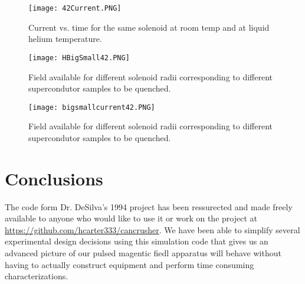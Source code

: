 \documentclass[prb,preprint]{revtex4-1}
\begin{document}
\begin{figure}[h!]
\centering
\texttt{[image: 42Current.PNG]}
\caption{Current vs. time for the same solenoid at room temp and at liquid helium temperature.}
\label{sunsets}
\end{figure}
\begin{figure}[h!]
\centering
\texttt{[image: HBigSmall42.PNG]}
\caption{Field available for different solenoid radii corresponding to different supercondutor samples to be quenched.}
\label{sunsets}
\end{figure}
\begin{figure}[h!]
\centering
\texttt{[image: bigsmallcurrent42.PNG]}
\caption{Field available for different solenoid radii corresponding to different supercondutor samples to be quenched.}
\label{sunsets}
\end{figure}
\section{Conclusions}
The code form Dr. DeSilva's 1994 project has been ressurected and made freely available to anyone who would like to use it or work on the project at \url{https://github.com/hcarter333/cancrusher}.  We have been able to simplify several experimental design decisions using this simulation code that gives us an advanced picture of our pulsed magentic fiedl apparatus will behave without having to actually construct equipment and perform time consuming characterizations.
\end{document}
